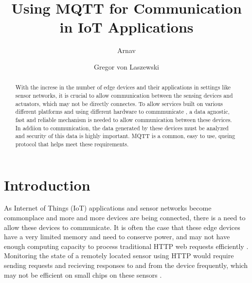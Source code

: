 \documentclass[sigconf]{acmart}
\begin{document}
\title{Using MQTT for Communication in IoT Applications}


\author{Arnav}

\author{Gregor von Laszewski}




\begin{abstract}
With the increse in the number of edge devices and their applications in settings like sensor networks, it is crucial to allow communication between the sensing devices and actuators, which may not be directly connectes. To allow services built on various different platforms and using different hardware to commmunicate , a data agnostic, fast and reliable mechanism is needed to allow communication between these devices. In addiion to communication, the data generated by these devices must be analyzed and security of this data is highly important. MQTT is a common, easy to use, queing protocol that helps meet these requirements.
\end{abstract}



\maketitle



\section{Introduction}
As Internet of Things (IoT) applications and sensor networks become commonplace and more and more devices are being connected, there is a need to allow these devices to communicate. It is often the case that these edge devices have a very limited memory and need to conserve power, and may not have enough computing capacity to process traditional HTTP web requests efficiently \cite{mqtt-vs-http}\cite{hivemq-website}. Monitoring the state of a remotely located sensor using HTTP would require sending requests and recieving responses to and from the device frequently, which may not be efficient on small chips on these sensors \cite{mqtt-vs-http}.
\end{document}
